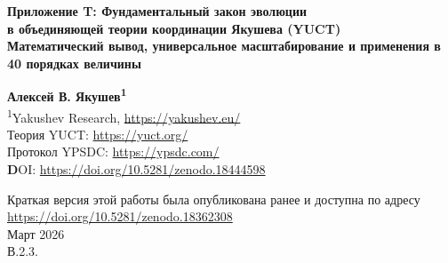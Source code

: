\documentclass[12pt,a4paper]{article}
\theoremstyle{remark}
\begin{document}
	
	\begin{titlepage}
		\begin{center}
			\vspace*{1cm}
			
			\Huge\textbf{Приложение T: Фундаментальный закон эволюции \\ в объединяющей теории координации Якушева (YUCT)} \\
			\vspace{0.5cm}
			\Large\textbf{Математический вывод, универсальное масштабирование и применения в 40 порядках величины}
			
			\vspace{1.5cm}
			
			\Large\textbf{Алексей В. Якушев\textsuperscript{1}} \\
			
			\vspace{0.3cm}
			\large
			\textsuperscript{1}Yakushev Research, \url{https://yakushev.eu/} \\
			
			\vspace{1cm}
			\large
			Теория YUCT: \url{https://yuct.org/}\\
			Протокол YPSDC: \url{https://ypsdc.com/}\\
			
			\vspace{2cm}
			\textbf DOI: \url{https://doi.org/10.5281/zenodo.18444598}\\
			
			\vspace{1cm}
			
			\vspace{0cm}
			\large 
			Краткая версия этой работы была опубликована ранее и доступна по адресу\\ \url{https://doi.org/10.5281/zenodo.18362308}\\
			\vspace{1cm}
			Март 2026 \\ \large В.2.3.
			
			\vspace{2cm}
			

\end{center}
\end{titlepage}
\end{document}
